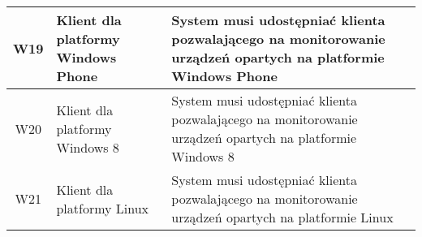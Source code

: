 \begin{longtable}[c]{|c||p{3.5cm}|p{9cm}|}
  W19 & \raggedright{Klient dla platformy Windows Phone} & \raggedright{System musi udostępniać klienta pozwalającego na monitorowanie urządzeń opartych na platformie Windows Phone} \tabularnewline 
  \hline

  W20 & \raggedright{Klient dla platformy Windows 8} & \raggedright{System musi udostępniać klienta pozwalającego na monitorowanie urządzeń opartych na platformie Windows 8} \tabularnewline
  \hline

  W21 & \raggedright{Klient dla platformy Linux} & \raggedright{System musi udostępniać klienta pozwalającego na monitorowanie urządzeń opartych na platformie Linux} \tabularnewline
  \hline
\end{longtable}
